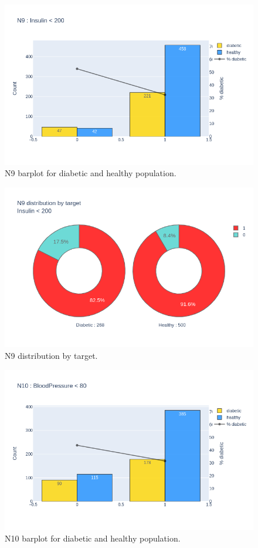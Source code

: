 \documentclass[12pt]{article}
\begin{document}
\begin{figure}[ht]
\centering
\includegraphics[width=1\textwidth]{newplot(32).png}
\caption{\label{fig:41} N9 barplot for diabetic and healthy population.}
\end{figure}

\begin{figure}[ht]
\centering
\includegraphics[width=1\textwidth]{newplot(33).png}
\caption{\label{fig:42} N9 distribution by target.}
\end{figure}

\begin{figure}[ht]
\centering
\includegraphics[width=1\textwidth]{newplot(34).png}
\caption{\label{fig:43} N10 barplot for diabetic and healthy population.}
\end{figure}
\end{document}
